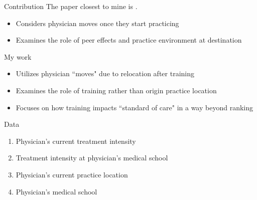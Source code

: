 \documentclass[10pt,aspectratio=169]{beamer}
\begin{document}
\begin{frame}{Contribution}
    The paper closest to mine is . 
    \begin{itemize}
        \item Considers physician moves once they start practicing
        \item Examines the role of peer effects and practice environment at destination 
    \end{itemize}

    \vspace{2.5mm}
    My work 
    \begin{itemize} 
        \item Utilizes physician ``moves" due to relocation after training
        \item Examines the role of training rather than origin practice location
        \item Focuses on how training impacts ``standard of care" in a way beyond ranking 
    \end{itemize}
\end{frame}

\begin{frame}{Data}
    \begin{enumerate}
        \item Physician's current treatment intensity 
        \item Treatment intensity at physician's medical school 
        \item Physician's current practice location 
        \item Physician's medical school 
    \end{enumerate} 

\end{frame}
\end{document}

